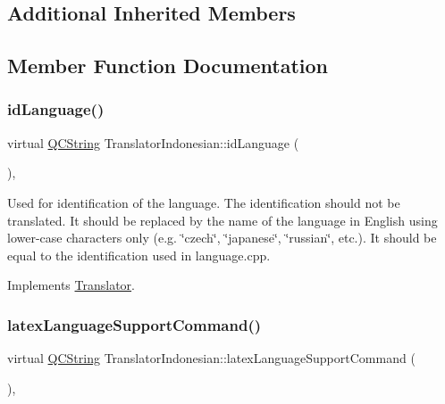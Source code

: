 \subsection*{Additional Inherited Members}


\subsection{Member Function Documentation}
\mbox{\label{class_translator_indonesian_a9cce3baab6f6f8035efb9581b22c96dd}} 
\subsubsection{\texorpdfstring{idLanguage()}{idLanguage()}}
{\footnotesize\ttfamily virtual \mbox{\hyperlink{class_q_c_string}{Q\+C\+String}} Translator\+Indonesian\+::id\+Language (\begin{DoxyParamCaption}{ }\end{DoxyParamCaption})\hspace{0.3cm}{\ttfamily [inline]}, {\ttfamily [virtual]}}

Used for identification of the language. The identification should not be translated. It should be replaced by the name of the language in English using lower-\/case characters only (e.\+g. \char`\"{}czech\char`\"{}, \char`\"{}japanese\char`\"{}, \char`\"{}russian\char`\"{}, etc.). It should be equal to the identification used in language.\+cpp. 

Implements \mbox{\hyperlink{class_translator}{Translator}}.

\mbox{\label{class_translator_indonesian_a61b5ee3ad83a1789f4767a6590407e6f}} 
\subsubsection{\texorpdfstring{latexLanguageSupportCommand()}{latexLanguageSupportCommand()}}
{\footnotesize\ttfamily virtual \mbox{\hyperlink{class_q_c_string}{Q\+C\+String}} Translator\+Indonesian\+::latex\+Language\+Support\+Command (\begin{DoxyParamCaption}{ }\end{DoxyParamCaption})\hspace{0.3cm}{\ttfamily [inline]}, {\ttfamily [virtual]}}

